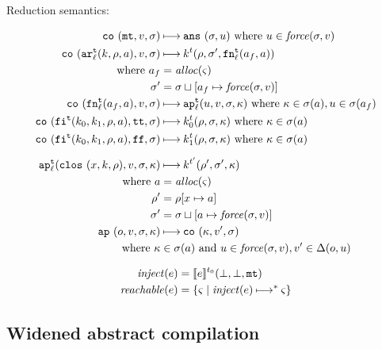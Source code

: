 \documentclass{llncs}
\begin{document}
Reduction semantics:

\begin{gather*}
\begin{align*}
\co{\kmt,\mval,\msto} &\machstep
\ans{\msto,\mvalx{u}}
\text{ where } \mvalx{u} \in \spchoice{\force(\msto,\mval)}{\force(\mval)}
\\
\co{\kar[^\mcntr_\mlab]{\mcomp,\menv,\maddr},\mval,\msto} & \machstep
\mcomp^\mcntr(\menv,\msto',\kfn[^\mcntr_\mlab]{\maddr_f,\maddr})
\\
\text{ where }\maddr_f &= \alloc(\mstate) \\
              \msto' &= \msto\sqcup[\maddr_f \mapsto \spchoice{\force(\msto,\mval)}{\force(\mval)}]
\\
\co{\kfn[^\mcntr_\mlab]{\maddr_f,\maddr},\mval,\msto} & \machstep
\ap[^\mcntr_\mlab]{\mvalx{u},\mval,\msto,\mkont}
\text{ where } \mkont \in \msto(\maddr), \mvalx{u} \in \msto(\maddr_f)
\\
\co{\kif[^\mcntr]{\mcompi0,\mcompi1,\menv,\maddr},\strue,\msto} & \machstep
\mcompi0^\mcntr(\menv,\msto,\mkont)
\text{ where }\mkont\in\msto(\maddr)
\\
\co{\kif[^\mcntr]{\mcompi0,\mcompi1,\menv,\maddr},\sfalse,\msto} & \machstep
\mcompi1^\mcntr(\menv,\msto,\mkont)
\text{ where }\mkont\in\msto(\maddr)
\\[2mm]
\ap[^\mcntr_\mlab]{\clos{\mvar,\mcomp,\menv},\mval,\msto,\mkont} & \machstep
\mcomp^{\mcntr'}(\menv',\msto',\mkont) \\
\text{ where }
\maddr &= \alloc(\mstate) \\
\menv' &= \menv[\mvar \mapsto \maddr] \\
\msto' &= \msto\sqcup[\maddr \mapsto \spchoice{\force(\msto, \mval)}{\force(\mval)}]
\\
\ap{\mop,\mval,\msto,\mkont} & \machstep
\co{\mkont,\mval',\msto} \\
\text{ where }\mkont &\in\msto(\maddr)
\text{ and } \mvalx{u} \in \spchoice{\force(\msto,\mval)}{\force(\mval)}, \mval'\in\interpdelta(\mop,\mvalx{u})
\end{align*}
\end{gather*}

\begin{align*}
\inject(\mexp) &= \compile{\mexp}^{\mtcntr}(\bot,\bot,\kmt) \\
\reachable{\mexp} &= \setof{\mstate \mid \inject(\mexp) \machstep^* \mstate}
\end{align*}

\subsection{Widened abstract compilation}
\end{document}
